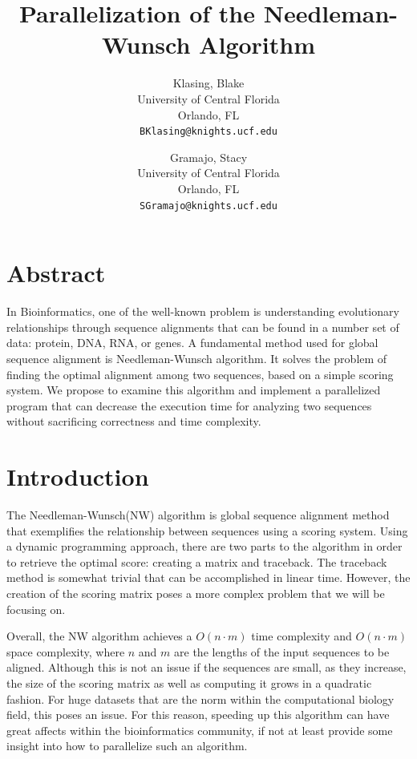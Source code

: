 \documentclass[letterpaper, 10 pt, conference]{IEEEconf}
\begin{document}
\title{\LARGE\bfseries Parallelization of the Needleman-Wunsch Algorithm}

\author{
	Klasing, Blake\\
	University of Central Florida \\
	Orlando, FL \\
	\texttt{BKlasing@knights.ucf.edu}
	\and
	Gramajo, Stacy\\
	University of Central Florida \\
	Orlando, FL \\
	\texttt{SGramajo@knights.ucf.edu} \\
	}
\maketitle
\section{Abstract}

In Bioinformatics, one of the well-known problem is understanding evolutionary relationships through sequence alignments that can be found in a number set of data: protein, DNA, RNA, or genes. A fundamental method used for global sequence alignment is Needleman-Wunsch algorithm. It solves the problem of finding the optimal alignment among two sequences, based on a simple scoring system. We propose to examine this algorithm and implement a parallelized program that can decrease the execution time for analyzing two sequences without sacrificing correctness and time complexity.


\section{Introduction}

The Needleman-Wunsch(NW) algorithm is global sequence alignment method that exemplifies the relationship between sequences using a scoring system. Using a dynamic programming approach, there are two parts to the algorithm in order to retrieve the optimal score: creating a matrix and traceback. The traceback method is somewhat trivial that can be accomplished in linear time. However, the creation of the scoring matrix poses a more complex problem that we will be focusing on. 

Overall, the NW algorithm achieves a $O(n\cdot m)$ time complexity and $O(n\cdot m)$ space complexity, where $n$ and $m$ are the lengths of the input sequences to be aligned. Although this is not an issue if the sequences are small, as they increase, the size of the scoring matrix as well as computing it grows in a quadratic fashion. For huge datasets that are the norm within the computational biology field, this poses an issue. For this reason, speeding up this algorithm can have great affects within the bioinformatics community, if not at least provide some insight into how to parallelize such an algorithm. 
\end{document}
